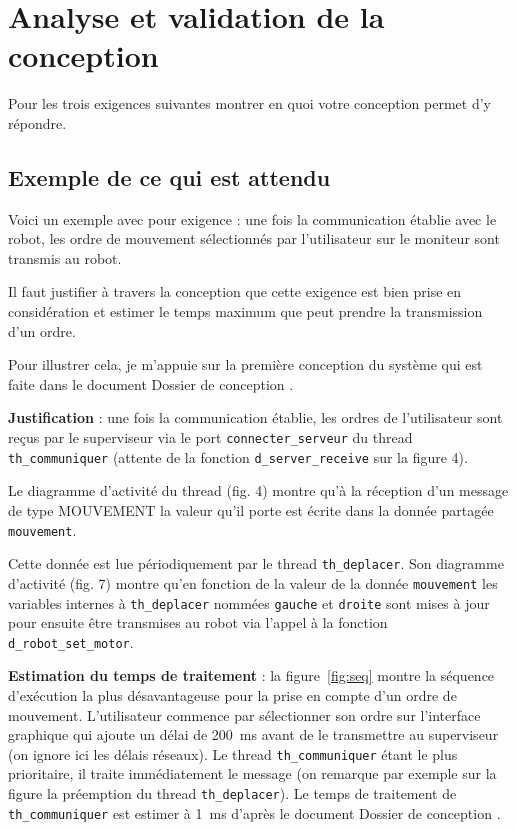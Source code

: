 \documentclass[11pt, a4paper]{paper}
\begin{document}
\section{Analyse et validation de la conception}

{\color{red}
Pour les trois exigences suivantes montrer en quoi votre conception permet d’y répondre. }

{\color{red} \subsection*{Exemple de ce qui est attendu}

Voici un exemple avec pour exigence : \og une fois la communication établie avec le robot, les ordre de mouvement sélectionnés par l'utilisateur sur le moniteur sont transmis au robot.\fg\ 

Il faut justifier à travers la conception que cette exigence est bien prise en considération et estimer le temps maximum que peut prendre la transmission d'un ordre.

Pour illustrer cela, je m'appuie sur la première conception du système qui est faite  dans le document \og Dossier de conception \fg.

{\bf Justification} : une fois la communication établie, les ordres de l'utilisateur sont reçus par le superviseur via le port {\tt connecter\_serveur} du thread {\tt th\_communiquer} (attente de la fonction {\tt d\_server\_receive} sur la figure 4).

Le diagramme d'activité du thread (fig. 4) montre qu'à la réception d'un message de type MOUVEMENT la valeur qu'il porte est écrite dans la donnée partagée {\tt mouvement}. 

Cette donnée est lue périodiquement par le thread {\tt th\_deplacer}. Son diagramme d'activité (fig. 7) montre qu'en fonction de la valeur de la donnée {\tt mouvement} les variables  internes à {\tt th\_deplacer} nommées {\tt gauche} et {\tt droite} sont mises à jour pour ensuite être transmises au robot via l'appel à la fonction {\tt d\_robot\_set\_motor}.

{\bf Estimation du temps de traitement} : la figure~\ref{fig:seq} montre la séquence d'exécution la plus désavantageuse pour la prise en compte d'un ordre de mouvement. L'utilisateur commence par sélectionner son ordre sur l'interface graphique qui ajoute un délai de 200~ms avant de le transmettre au superviseur (on ignore ici les délais réseaux). Le thread {\tt th\_communiquer} étant le plus prioritaire, il traite immédiatement le message (on remarque par exemple sur la figure la préemption du thread {\tt th\_deplacer}). Le temps de traitement de {\tt th\_communiquer} est estimer à 1~ms d'après le document \og Dossier de conception \fg.

}
\end{document}
